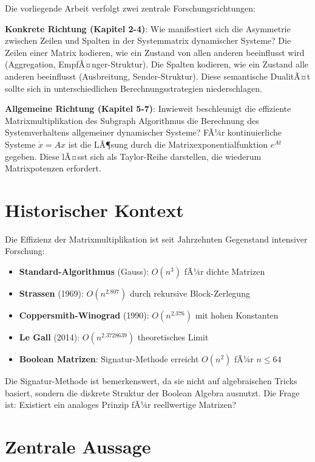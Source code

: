﻿\documentclass[a4paper,12pt]{report}
\theoremstyle{definition}
\begin{document}
	Die vorliegende Arbeit verfolgt zwei zentrale Forschungsrichtungen:
	
	\textbf{Konkrete Richtung (Kapitel 2-4)}: Wie manifestiert sich die Asymmetrie zwischen Zeilen und Spalten in der Systemmatrix dynamischer Systeme? Die Zeilen einer Matrix kodieren, wie ein Zustand von allen anderen beeinflusst wird (Aggregation, EmpfÃ¤nger-Struktur). Die Spalten kodieren, wie ein Zustand alle anderen beeinflusst (Ausbreitung, Sender-Struktur). Diese semantische DualitÃ¤t sollte sich in unterschiedlichen Berechnungsstrategien niederschlagen.
	
	\textbf{Allgemeine Richtung (Kapitel 5-7)}: Inwieweit beschleunigt die effiziente Matrixmultiplikation des Subgraph Algorithmus die Berechnung des Systemverhaltens allgemeiner dynamischer Systeme? FÃ¼r kontinuierliche Systeme $\dot{x} = Ax$ ist die LÃ¶sung durch die Matrixexponentialfunktion $e^{At}$ gegeben. Diese lÃ¤sst sich als Taylor-Reihe darstellen, die wiederum Matrixpotenzen erfordert.
	
	\section{Historischer Kontext}
	
	Die Effizienz der Matrixmultiplikation ist seit Jahrzehnten Gegenstand intensiver Forschung:
	
	\begin{itemize}
		\item \textbf{Standard-Algorithmus} (Gauss): $O(n^3)$ fÃ¼r dichte Matrizen
		\item \textbf{Strassen} (1969): $O(n^{2.807})$ durch rekursive Block-Zerlegung
		\item \textbf{Coppersmith-Winograd} (1990): $O(n^{2.376})$ mit hohen Konstanten
		\item \textbf{Le Gall} (2014): $O(n^{2.3728639})$ theoretisches Limit
		\item \textbf{Boolean Matrizen}: Signatur-Methode erreicht $O(n^2)$ fÃ¼r $n \leq 64$
	\end{itemize}
	
	Die Signatur-Methode ist bemerkenswert, da sie nicht auf algebraischen Tricks basiert, sondern die diskrete Struktur der Boolean Algebra ausnutzt. Die Frage ist: Existiert ein analoges Prinzip fÃ¼r reellwertige Matrizen?
	
	\section{Zentrale Aussage}
	
\end{document}
